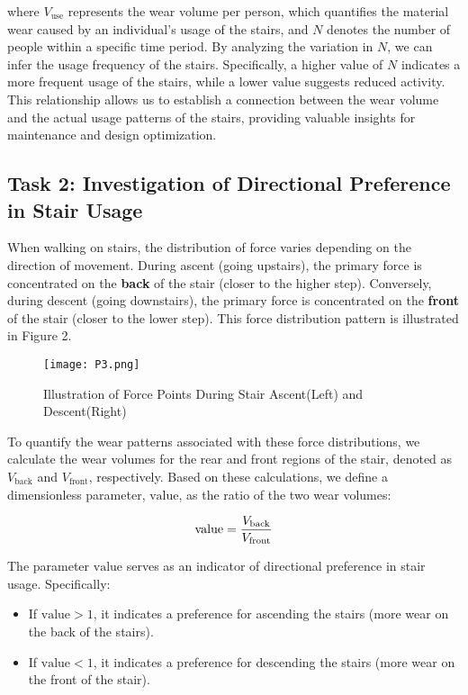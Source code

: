 \documentclass{mcmthesis}
\begin{document}
where \( V_{\text{use}} \) represents the wear volume per person, which quantifies the material wear caused by an individual's usage of the stairs, and \( N \) denotes the number of people within a specific time period. By analyzing the variation in \( N \), we can infer the usage frequency of the stairs. Specifically, a higher value of \( N \) indicates a more frequent usage of the stairs, while a lower value suggests reduced activity. This relationship allows us to establish a connection between the wear volume and the actual usage patterns of the stairs, providing valuable insights for maintenance and design optimization.

\subsection{Task 2: Investigation of Directional Preference in Stair Usage}
\hspace{1.5em}When walking on stairs, the distribution of force varies depending on the direction of movement. During ascent (going upstairs), the primary force is concentrated on the \textbf{back} of the stair (closer to the higher step). Conversely, during descent (going downstairs), the primary force is concentrated on the \textbf{front} of the stair (closer to the lower step). This force distribution pattern is illustrated in Figure 2.

\begin{figure}[h] %
    \centering
    \texttt{[image: P3.png]} 
    \caption{Illustration of Force Points During Stair Ascent(Left) and Descent(Right)}
    \label{fig3}
\end{figure}

To quantify the wear patterns associated with these force distributions, we calculate the wear volumes for the rear and front regions of the stair, denoted as \( V_{\text{back}} \) and \( V_{\text{front}} \), respectively. Based on these calculations, we define a dimensionless parameter, \( \text{value} \), as the ratio of the two wear volumes:

\begin{equation}
    \hfill \text{value} = \frac{V_{\text{back}}}{V_{\text{front}}}
    \label{eq:value}
\end{equation}
       
The parameter \( \text{value} \) serves as an indicator of directional preference in stair usage. Specifically:
\begin{itemize}
    \item If \( \text{value} > 1 \), it indicates a preference for ascending the stairs (more wear on the back of the stairs).
    \item If \( \text{value} < 1 \), it indicates a preference for descending the stairs (more wear on the front of the stair).
\end{itemize}
\end{document}
